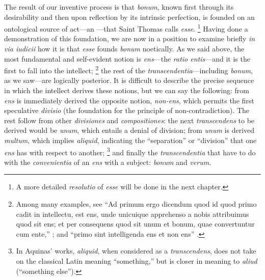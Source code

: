 {The result of our inventive process is that \emph{bonum}, known first through its desirability and then upon reflection by its intrinsic perfection, is founded on an ontological source of act---an ---that Saint Thomas calls \emph{esse}.%
%
\footnote{A more detailed \emph{resolutio} of \emph{esse} will be done in the next chapter.} Having done a demonstration of this foundation, we are now in a position to examine briefly \emph{in via iudicii} how it is that \emph{esse} founds \emph{bonum} noetically. As we said above, the most fundamental and self-evident notion is \emph{ens}---the \emph{ratio entis}---and it is the first to fall into the intellect;%
%
\footnote{Among many examples, see ``Ad primum ergo dicendum quod id quod primo cadit in intellectu, est ens, unde unicuique apprehenso a nobis attribuimus quod sit ens; et per consequens quod sit unum et bonum, quae convertuntur cum ente,'' \parencite[I-II, q.~55, a.~4, ad 1]{st:summa}; and ``primo sint intelligenda ens et non ens'' \parencite[pars~2, q.~4, a.~1, co.~2]{st:detrinitate}.}
%
the rest of the \emph{transcendentia}---including \emph{bonum}, as we saw---are logically posterior. It is difficult to describe the precise sequence in which the intellect derives these notions, but we can say the following: from \emph{ens} is immediately derived the opposite notion, \emph{non-ens}, which permits the first speculative \emph{divisio} (the foundation for the principle of non-contradiction). The rest follow from other \emph{divisiones} and \emph{compositiones}: the next \emph{transcendens} to be derived would be \emph{unum}, which entails a denial of division; from \emph{unum} is derived \emph{multum}, which implies \emph{aliquid}, indicating the ``separation'' or ``division'' that one \emph{ens} has with respect to another;%
%
\footnote{In Aquinas' works, \emph{aliquid}, when considered as a \emph{transcendens}, does not take on the classical Latin meaning ``something,'' but is closer in meaning to \emph{aliud} (``something else'').}
%
and finally the \emph{transcendentia} that have to do with the \emph{convenientia} of an \emph{ens} with a subject: \emph{bonum} and \emph{verum}.%
%
}

